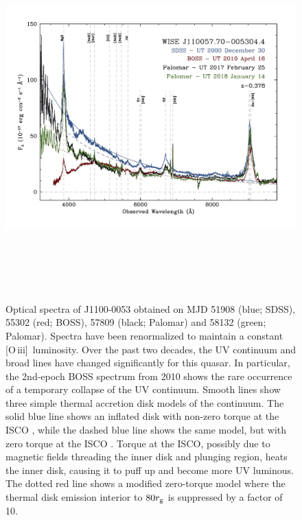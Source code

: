 \documentclass{nature}
\newcommand{\oiii}{[O\,{\sc iii}]\ }
\begin{document}
\begin{figure}
  \centering
  \includegraphics[width=17.00cm, height=14.00cm, trim=0.0cm 0.0cm 0.0cm 0.0cm, clip]
  {../plots/spectra/w1100m0053_sdss_palomar2.jpg}
  \caption[]{Optical spectra of J1100-0053 obtained on MJD 51908
(blue; SDSS), 55302 (red; BOSS), 57809 (black; Palomar) and 58132
(green; Palomar). Spectra have been renormalized to maintain a
constant \oiii luminosity. Over the past two decades, the UV continuum
and broad lines have changed significantly for this quasar.  In
particular, the 2nd-epoch BOSS spectrum from 2010 shows the rare
occurrence of a temporary collapse of the UV continuum.  Smooth lines
show three simple thermal accretion disk models of the continuum.  The
solid blue line shows an inflated disk with non-zero torque at the
ISCO \cite[e.g.,][]{Sirko_Goodman2003}, while the dashed blue line
shows the same model, but with zero torque at the ISCO \cite[i.e.,
equivalent to a simple $\alpha$-disk model,][]{SS73}.  Torque at the
ISCO, possibly due to magnetic fields threading the inner disk and
plunging region, heats the inner disk, causing it to puff up and
become more UV luminous.  The dotted red line shows a modified
zero-torque model where the thermal disk emission interior to $80
r_{\rm g}$ is suppressed by a factor of 10.}
  \label{fig:J110057_spectra}
\end{figure}
\end{document}
